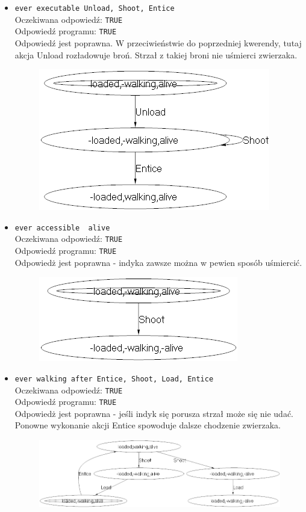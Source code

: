 \documentclass{article}
\begin{document}
\begin{itemize}
	\item {\large\texttt{ever executable Unload, Shoot, Entice}}\\
	Oczekiwana odpowiedź: \texttt{TRUE}\\
	Odpowiedź programu: \texttt{TRUE}\\
	Odpowiedź jest poprawna. W przeciwieństwie do poprzedniej kwerendy, tutaj akcja Unload rozładowuje broń. Strzał z takiej broni nie uśmierci zwierzaka.
	\begin{figure}[H]
		\centering
		\includegraphics[scale=0.6]{kwerenda3}
	\end{figure}
	
	\item {\large\texttt{ever accessible ~alive}}\\
	Oczekiwana odpowiedź: \texttt{TRUE}\\
	Odpowiedź programu: \texttt{TRUE}\\
	Odpowiedż jest poprawna - indyka zawsze można w pewien sposób uśmiercić.
	\begin{figure}[H]
		\centering
		\includegraphics[scale=0.6]{kwerenda4}
	\end{figure}
	
	\item {\large\texttt{ever walking after Entice, Shoot, Load, Entice}}\\
	Oczekiwana odpowiedź: \texttt{TRUE}\\
	Odpowiedź programu: \texttt{TRUE}\\
	Odpowiedż jest poprawna - jeśli indyk się porusza strzał może się nie udać. Ponowne wykonanie akcji Entice spowoduje dalsze chodzenie zwierzaka.
	\begin{figure}[H]
		\centering
		\includegraphics[scale=0.6]{kwerenda5}
	\end{figure}
\end{itemize}
\newpage
\end{document}
